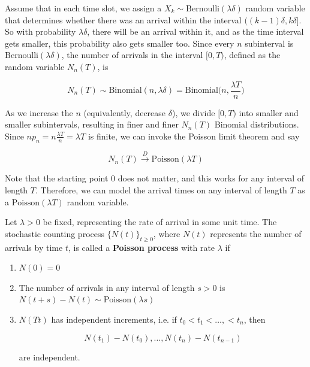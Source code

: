 \documentclass{article}
\begin{document}
    \begin{center}
    \end{center}

    Assume that in each time slot, we assign a $X_k \sim \mathrm{Bernoulli}(\lambda \delta)$ random variable that determines whether there was an arrival within the interval $((k-1)\delta, k\delta]$. So with probability $\lambda\delta$, there will be an arrival within it, and as the time interval gets smaller, this probability also gets smaller too. Since every $n$ subinterval is $\mathrm{Bernoulli}(\lambda \delta)$, the number of arrivals in the interval $[0, T)$, defined as the random variable $N_n (T)$, is 

      \[N_n (T) \sim \mathrm{Binomial}(n, \lambda \delta) = \mathrm{Binomial}\big(n, \frac{\lambda T}{n}\big)\]

    As we increase the $n$ (equivalently, decrease $\delta$), we divide $[0, T)$ into smaller and smaller subintervals, resulting in finer and finer $N_n(T)$ Binomial distributions. Since $n p_n = n \frac{\lambda T}{n} = \lambda T$ is finite, we can invoke the Poisson limit theorem and say 

      \[N_n (T) \xrightarrow{D} \mathrm{Poisson}(\lambda T)\]

    Note that the starting point $0$ does not matter, and this works for any interval of length $T$. Therefore, we can model the arrival times on any interval of length $T$ as a $\mathrm{Poisson}(\lambda T)$ random variable. 

    \begin{definition}
      Let $\lambda > 0$ be fixed, representing the rate of arrival in some unit time. The stochastic counting process $\{N(t)\}_{t \geq 0}$, where $N(t)$ represents the number of arrivals by time $t$, is called a \textbf{Poisson process} with rate $\lambda$ if 
      \begin{enumerate}
        \item $N(0) = 0$ 

        \item The number of arrivals in any interval of length $s > 0$ is $N(t + s) - N(t) \sim \mathrm{Poisson}(\lambda s)$ 

        \item $N(Tt)$ has independent increments, i.e. if $t_0 < t_1 < \ldots, < t_n$, then 

          \[N(t_1) - N(t_0), \ldots, N(t_n) - N(t_{n-1})\]

        are independent. 
      \end{enumerate}
    \end{definition}
\end{document}
